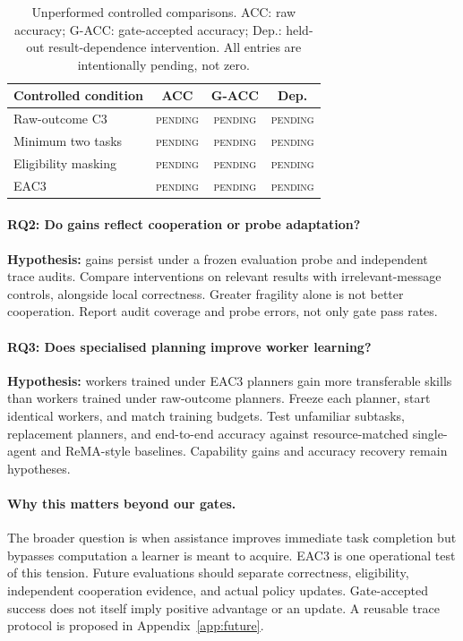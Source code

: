 \documentclass[11pt]{article}
\newcommand{\pending}{\textcolor{blue!65!black}{\textsc{pending}}}
\begin{document}
\begin{table}[t]
\centering
\small
\begin{tabular}{@{}lccc@{}}
\toprule
Controlled condition & ACC & G-ACC & Dep.\\
\midrule
Raw-outcome C3 & \pending & \pending & \pending\\
Minimum two tasks & \pending & \pending & \pending\\
Eligibility masking & \pending & \pending & \pending\\
EAC3 & \pending & \pending & \pending\\
\bottomrule
\end{tabular}
\caption{Unperformed controlled comparisons. ACC: raw accuracy; G-ACC: gate-accepted accuracy; Dep.: held-out result-dependence intervention. All entries are intentionally pending, not zero.}
\label{tab:planned}
\end{table}

\paragraph{RQ2: Do gains reflect cooperation or probe adaptation?}
\textbf{Hypothesis:} gains persist under a frozen evaluation probe and independent trace audits. Compare interventions on relevant results with irrelevant-message controls, alongside local correctness. Greater fragility alone is not better cooperation. Report audit coverage and probe errors, not only gate pass rates.

\paragraph{RQ3: Does specialised planning improve worker learning?}
\textbf{Hypothesis:} workers trained under EAC3 planners gain more transferable skills than workers trained under raw-outcome planners. Freeze each planner, start identical workers, and match training budgets. Test unfamiliar subtasks, replacement planners, and end-to-end accuracy against resource-matched single-agent and ReMA-style baselines. Capability gains and accuracy recovery remain hypotheses.

\paragraph{Why this matters beyond our gates.}
The broader question is when assistance improves immediate task completion but bypasses computation a learner is meant to acquire. EAC3 is one operational test of this tension. Future evaluations should separate correctness, eligibility, independent cooperation evidence, and actual policy updates. Gate-accepted success does not itself imply positive advantage or an update. A reusable trace protocol is proposed in Appendix~\ref{app:future}.
\end{document}
